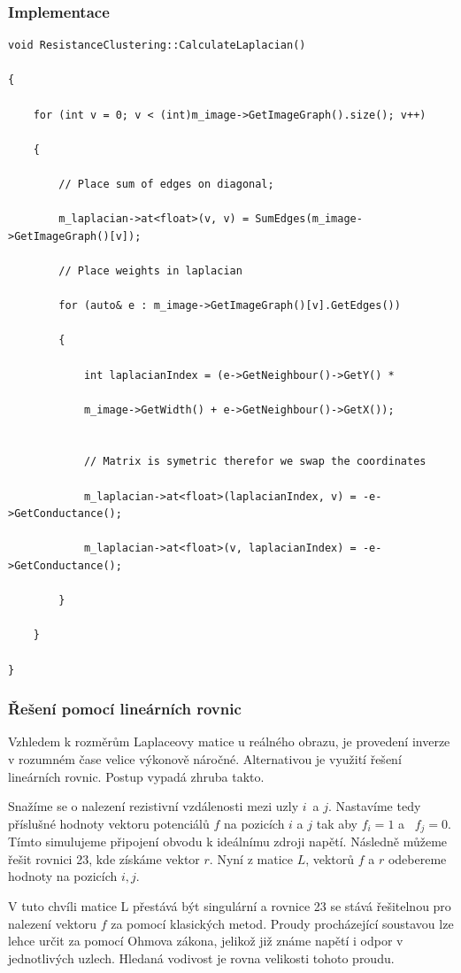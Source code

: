 \documentclass[czech, master, public, dept460, male, cpdeclaration, oneside]{diploma}
\begin{document}
\subsubsection{Implementace}
\begin{lstlisting}[label=src:Cpp,caption=Tvorba Laplaceovy matice v C++]
void ResistanceClustering::CalculateLaplacian()

{

	for (int v = 0; v < (int)m_image->GetImageGraph().size(); v++)

	{

		// Place sum of edges on diagonal;

		m_laplacian->at<float>(v, v) = SumEdges(m_image->GetImageGraph()[v]);
	
		// Place weights in laplacian

		for (auto& e : m_image->GetImageGraph()[v].GetEdges())

		{

			int laplacianIndex = (e->GetNeighbour()->GetY() *

			m_image->GetWidth() + e->GetNeighbour()->GetX());

			
			// Matrix is symetric therefor we swap the coordinates

			m_laplacian->at<float>(laplacianIndex, v) = -e->GetConductance();

			m_laplacian->at<float>(v, laplacianIndex) = -e->GetConductance();

		}

	}

}
\end{lstlisting}
\subsubsection{Řešení pomocí lineárních rovnic}
Vzhledem k rozměrům Laplaceovy matice u reálného obrazu, je provedení inverze v rozumném čase velice výkonově náročné. Alternativou je využití řešení lineárních rovnic. Postup vypadá zhruba takto. \par
Snažíme se o nalezení rezistivní vzdálenosti mezi uzly $i$ a $j$. Nastavíme tedy příslušné hodnoty vektoru potenciálů $f$ na pozicích $i$ a $j$ tak aby $f_i = 1$ a  $f_j = 0$. Tímto simulujeme připojení obvodu k ideálnímu zdroji napětí. Následně můžeme řešit rovnici 23, kde získáme vektor $r$. Nyní z matice $L$, vektorů $f$ a $r$ odebereme hodnoty na pozicích $i,j$. \par
V tuto chvíli matice L přestává být singulární a rovnice 23 se stává řešitelnou pro nalezení vektoru $f$ za pomocí klasických metod. Proudy procházející soustavou lze lehce určit za pomocí Ohmova zákona, jelikož již známe napětí i odpor v jednotlivých uzlech. Hledaná vodivost je rovna velikosti tohoto proudu.\cite{Gaura}
\end{document}
